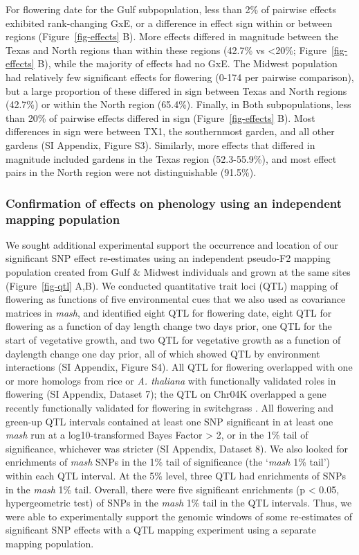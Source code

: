 \documentclass[
  9pt,
  twocolumn,
  twoside]{simple-article}%
\begin{document}
For flowering date for the Gulf subpopulation, less than 2\% of pairwise
effects exhibited rank-changing GxE, or a difference in effect sign
within or between regions (Figure~\ref{fig-effects} B). More effects
differed in magnitude between the Texas and North regions than within
these regions (42.7\% vs \textless20\%; Figure~\ref{fig-effects} B),
while the majority of effects had no GxE. The Midwest population had
relatively few significant effects for flowering (0-174 per pairwise
comparison), but a large proportion of these differed in sign between
Texas and North regions (42.7\%) or within the North region (65.4\%).
Finally, in Both subpopulations, less than 20\% of pairwise effects
differed in sign (Figure~\ref{fig-effects} B). Most differences in sign
were between TX1, the southernmost garden, and all other gardens (SI
Appendix, Figure S3). Similarly, more effects that differed in magnitude
included gardens in the Texas region (52.3-55.9\%), and most effect
pairs in the North region were not distinguishable (91.5\%).

\subsubsection{Confirmation of effects on phenology using an independent
mapping
population}\label{confirmation-of-effects-on-phenology-using-an-independent-mapping-population}

We sought additional experimental support the occurrence and location of
our significant SNP effect re-estimates using an independent pseudo-F2
mapping population created from Gulf \& Midwest individuals and grown at
the same sites (Figure~\ref{fig-qtl} A,B). We conducted quantitative
trait loci (QTL) mapping of flowering as functions of five environmental
cues that we also used as covariance matrices in \emph{mash}, and
identified eight QTL for flowering date, eight QTL for flowering as a
function of day length change two days prior, one QTL for the start of
vegetative growth, and two QTL for vegetative growth as a function of
daylength change one day prior, all of which showed QTL by environment
interactions (SI Appendix, Figure S4). All QTL for flowering overlapped
with one or more homologs from rice or \emph{A. thaliana} with
functionally validated roles in flowering (SI Appendix, Dataset 7); the
QTL on Chr04K overlapped a gene recently functionally validated for
flowering in switchgrass \citep{choi2023}. All flowering and green-up
QTL intervals contained at least one SNP significant in at least one
\emph{mash} run at a log10-transformed Bayes Factor \textgreater{} 2, or
in the 1\% tail of significance, whichever was stricter (SI Appendix,
Dataset 8). We also looked for enrichments of \emph{mash} SNPs in the
1\% tail of significance (the `\emph{mash} 1\% tail') within each QTL
interval. At the 5\% level, three QTL had enrichments of SNPs in the
\emph{mash} 1\% tail. Overall, there were five significant enrichments
(p \textless{} 0.05, hypergeometric test) of SNPs in the \emph{mash} 1\%
tail in the QTL intervals. Thus, we were able to experimentally support
the genomic windows of some re-estimates of significant SNP effects with
a QTL mapping experiment using a separate mapping population.
\end{document}
